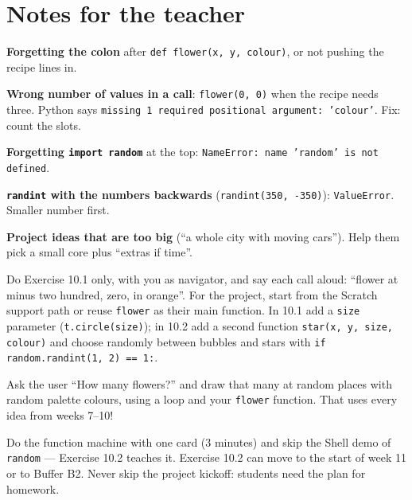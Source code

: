 \section{Notes for the teacher}
\begin{commonmistakes}
  \item \textbf{Forgetting the colon} after \texttt{def flower(x, y, colour)}, or not pushing the recipe lines in.
  \item \textbf{Wrong number of values in a call}: \texttt{flower(0, 0)} when the recipe needs three. Python says \texttt{missing 1 required positional argument: 'colour'}. Fix: count the slots.
  \item \textbf{Forgetting \texttt{import random}} at the top: \texttt{NameError: name 'random' is not defined}.
  \item \textbf{\texttt{randint} with the numbers backwards} (\texttt{randint(350, -350)}): \texttt{ValueError}. Smaller number first.
  \item \textbf{Project ideas that are too big} (\enquote{a whole city with moving cars}). Help them pick a small core plus \enquote{extras if time}.
\end{commonmistakes}
\begin{differentiation}
\supportpath Do Exercise 10.1 only, with you as navigator, and say each call aloud: \enquote{flower at minus two hundred, zero, in orange}. For the project, start from the Scratch support path or reuse \texttt{flower} as their main function.
\extensionpath In 10.1 add a \texttt{size} parameter (\texttt{t.circle(size)}); in 10.2 add a second function \texttt{star(x, y, size, colour)} and choose randomly between bubbles and stars with \texttt{if random.randint(1, 2) == 1:}.
\end{differentiation}
\begin{stretchchallenge}
Ask the user \enquote{How many flowers?} and draw that many at random places with random palette colours, using a loop and your \texttt{flower} function. That uses every idea from weeks 7--10!
\end{stretchchallenge}
\begin{teachernote}
Do the function machine with one card (3 minutes) and skip the Shell demo of \texttt{random} --- Exercise 10.2 teaches it. Exercise 10.2 can move to the start of week 11 or to Buffer B2. Never skip the project kickoff: students need the plan for homework.
\end{teachernote}
